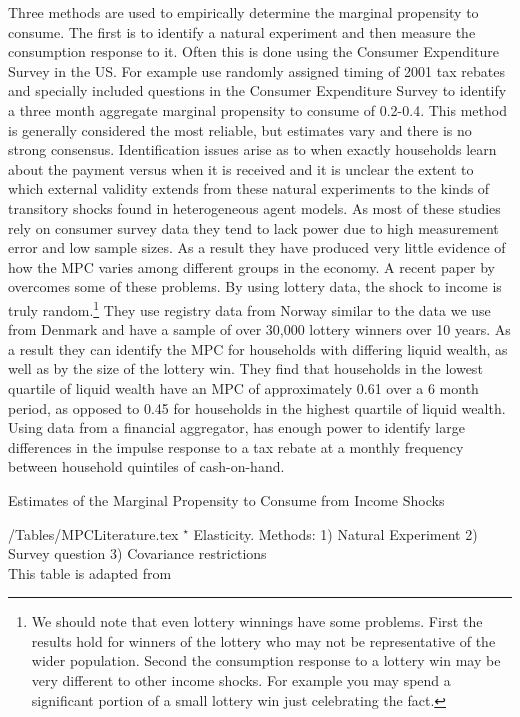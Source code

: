 \documentclass[titlepage]{\econtex}\newcommand{\texname}{ConsumptionHeterogeneity}
\begin{document}
Three methods are used to empirically determine the marginal propensity to consume. The first is to identify a natural experiment and then measure the consumption response to it. Often this is done using the Consumer Expenditure Survey in the US. For example \cite{johnson_household_2006} use randomly assigned timing of 2001 tax rebates and specially included questions in the Consumer Expenditure Survey to identify a three month aggregate marginal propensity to consume of 0.2-0.4. This method is generally considered the most reliable, but estimates vary and there is no strong consensus. Identification issues arise as to when exactly households learn about the payment versus when it is received and it is unclear the extent to which external validity extends from these natural experiments to the kinds of transitory shocks found in heterogeneous agent models. As most of these studies rely on consumer survey data they tend to lack power due to high measurement error and low sample sizes. As a result they have produced very little evidence of how the MPC varies among different groups in the economy. A recent paper by \cite{fagereng_mpc_2016} overcomes some of these problems. By using lottery data, the shock to income is truly random.\footnote{We should note that even lottery winnings have some problems. First the results hold for winners of the lottery who may not be representative of the wider population. Second the consumption response to a lottery win may be very different to other income shocks. For example you may spend a significant portion of a small lottery win just celebrating the fact.} They use registry data from Norway similar to the data we use from Denmark and have a sample of over 30,000 lottery winners over 10 years. As a result they can identify the MPC for households with differing liquid wealth, as well as by the size of the lottery win. They find that households in the lowest quartile of liquid wealth have an MPC of approximately 0.61 over a 6 month period, as opposed to 0.45 for households in the highest quartile of liquid wealth. Using data from a financial aggregator, \cite{gelman_what_2016} has enough power to identify large differences in the impulse response to a tax rebate at a monthly frequency between household quintiles of cash-on-hand.
\begin{sidewaystable} \small
	\caption{Estimates of the Marginal Propensity to Consume from Income Shocks}
	\label{table:MPCLiterature}
	\begin{minipage}{\textwidth}
		\econtexRoot/Tables/MPCLiterature.tex 
		\footnotesize{$^{\star}$ Elasticity. Methods: 1) Natural Experiment 2) Survey question 3) Covariance restrictions \\
		This table is adapted from \cite{carroll_distribution_2017}}
	\end{minipage}
\end{sidewaystable}
\end{document}
